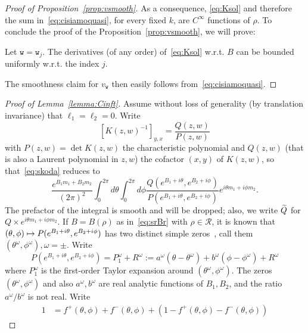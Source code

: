 \documentclass[AHL,Unicode,longabstracts,published]{cedram}
\newcommand{\ttw}{\mathtt{w}}
\newcommand{\clR}{\mathcal{R}}
\let\oldtilde\tilde
\renewcommand*{\tilde}[1]{\mathchoice{\widetilde{#1}}{\widetilde{#1}}{\oldtilde{#1}}{\oldtilde{#1}}}
\newcommand{\ttw}{\mathtt{w}}
\begin{document}
\begin{proof}[{Proof of Proposition~\ref{prop:vsmooth}}]
As a consequence, \eqref{eq:Ksol} and therefore the sum in~\eqref{eq:cisiamoquasi}, for every fixed $k$, are $C^\infty$ functions of $\rho$. To conclude the proof of the Proposition~\ref{prop:vsmooth}, we will prove:
\begin{lemm}\label{lemma:GK}
Let $\ttw=\ttw_j$. The derivatives (of any order) of~\eqref{eq:Ksol} w.r.t. $B$ can be bounded uniformly w.r.t. the index $j$.
\end{lemm}

The smoothness claim for $v_{\ttw}$ then easily follows from~\eqref{eq:cisiamoquasi}.
\end{proof}

\begin{proof}[{Proof of Lemma~\ref{lemma:Cinft}}]
Assume without loss of generality (by translation invariance) that $\ell_1=\ell_2=0$. Write
\begin{equation}
\left[K(z,w)^{-1}\right]_{y,x}=\frac{Q(z,w)}{P(z,w)}
\end{equation}
with $P(z,w)=\det K(z,w)$ the characteristic polynomial and $Q(z,w)$ (that is also a Laurent polynomial in $z,w$) the cofactor $(x,y)$ of $K(z,w)$, so that~\eqref{eq:skoda} reduces to
\begin{equation}
\frac{e^{B_1 m_1+B_2 m_2}}{(2\pi)^2}\int_0^{2\pi} d\theta \int_0^{2\pi} d \phi \frac{Q\left(e^{B_1+i\theta},e^{B_2+i\phi}\right)}{P\left(e^{B_1+i\theta},e^{B_2+i\phi}\right)}e^{i \theta m_1+i\phi m_2}.
\end{equation}
The prefactor of the integral is smooth and will be dropped; also, we write $\tilde Q$ for $Q\times e^{i \theta m_1+i\phi m_2}$. If $B=B(\rho)$ as in~\eqref{eq:srBr} with $\rho\in\clR$, it is known that $(\theta,\phi)\linebreak\mapsto P(e^{B_1+i\theta},e^{B_2+i\phi})$ has two distinct simple zeros~\cite{KOS03}, call them $(\theta^\omega,\phi^\omega),\omega=\pm$. Write
\begin{equation}
P\left(e^{B_1+i\theta},e^{B_2+i\phi}\right)=P^\omega_1+R^\omega:=a^\omega\left(\theta-\theta^\omega\right)+b^\omega\left(\phi-\phi^\omega\right)+R^\omega
\end{equation}
where $P^\omega_1$ is the first-order Taylor expansion around $(\theta^\omega,\phi^\omega)$. The zeros $(\theta^\omega,\phi^\omega)$ and also $a^\omega,b^\omega$ are real analytic functions of $B_1,B_2$, and the ratio $a^\omega/b^\omega$ is not real. Write
\begin{align}
1 &=f^+(\theta,\phi)+f^-(\theta,\phi)+\left(1-f^+(\theta,\phi)-f^-(\theta,\phi)\right)

\end{align}
\end{proof}
\end{document}
